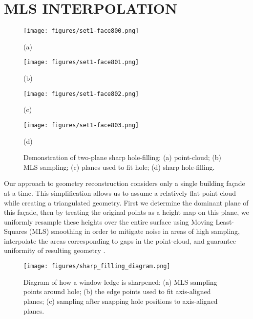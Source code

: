 \documentclass{article}
\begin{document}
\section{MLS INTERPOLATION}
\label{sec:mls}

\begin{figure}[t]

\begin{minipage}[b]{.48\linewidth}
  \centering
  \centerline{\texttt{[image: figures/set1-face800.png]}}
  \centerline{(a)}\medskip
\end{minipage}
\hfill
\begin{minipage}[b]{.48\linewidth}
  \centering
  \centerline{\texttt{[image: figures/set1-face801.png]}}
  \centerline{(b)}\medskip
\end{minipage}
\begin{minipage}[b]{.48\linewidth}
  \centering
  \centerline{\texttt{[image: figures/set1-face802.png]}}
  \centerline{(c)}\medskip
\end{minipage}
\hfill
\begin{minipage}[b]{.48\linewidth}
  \centering
  \centerline{\texttt{[image: figures/set1-face803.png]}}
  \centerline{(d)}\medskip
\end{minipage}
%
\caption{Demonstration of two-plane sharp hole-filling; (a) point-cloud; (b) MLS sampling; (c) planes used to fit hole; (d) sharp hole-filling.}
\label{fig:face8-sharp}
%
\end{figure}

Our approach to geometry reconstruction considers only a single building fa\c{c}ade at a time.  This simplification allows us to assume a relatively flat point-cloud while creating a triangulated geometry.  First we determine the dominant plane of this fa\c{c}ade, then by treating the original points as a height map on this plane, we uniformly resample these heights over the entire surface using Moving Least-Squares (MLS) smoothing in order to mitigate noise in areas of high sampling, interpolate the areas corresponding to gaps in the point-cloud, and guarantee uniformity of resulting geometry \cite{Nealen04}.

\begin{figure}[t]

\begin{minipage}[b]{1.0\linewidth}
  \centering
  \centerline{\texttt{[image: figures/sharp\_filling\_diagram.png]}}
\end{minipage}
%
\caption{Diagram of how a window ledge is sharpened; (a) MLS sampling points around hole; (b) the edge points used to fit axis-aligned planes; (c) sampling after snapping hole positions to axis-aligned planes.}
\label{fig:sharp-plane-fitting}
%
\end{figure}
\end{document}
